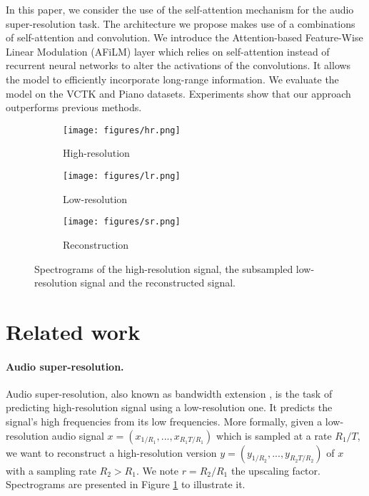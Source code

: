 \documentclass{article}
\begin{document}
In this paper, we consider the use of the self-attention mechanism for the audio super-resolution task. The architecture we propose makes use of a combinations of self-attention and convolution. We introduce the Attention-based Feature-Wise Linear Modulation (AFiLM) layer which relies on self-attention instead of recurrent neural networks to alter the activations of the convolutions. It allows the model to efficiently incorporate long-range information. We evaluate the model on the VCTK \cite{yamagishi2012english} and Piano \cite{mehri2016samplernn} datasets. Experiments show that our approach outperforms previous methods.

\begin{figure}
    \centering
    \begin{subfigure}[b]{0.15\textwidth}
        \centering
        \texttt{[image: figures/hr.png]}
        \caption{High-resolution}
    \end{subfigure}
    \begin{subfigure}[b]{0.15\textwidth}
        \centering
        \texttt{[image: figures/lr.png]}
        \caption{Low-resolution}
    \end{subfigure}
    \begin{subfigure}[b]{0.15\textwidth}
        \centering
        \texttt{[image: figures/sr.png]}
        \caption{Reconstruction}
    \end{subfigure}
    \caption{Spectrograms of the high-resolution signal, the subsampled low-resolution signal and the reconstructed signal.}
    \label{fig:spectrogram}
\end{figure}

\section{Related work}
\label{sec:related_work}
\paragraph*{Audio super-resolution.}
Audio super-resolution, also known as bandwidth extension \cite{ekstrand2002bandwidth,larsen2005audio}, is the task of predicting high-resolution signal using a low-resolution one. It predicts the signal’s high frequencies from its low frequencies. More formally, given a low-resolution audio signal $x=(x_{1/R_1},...,x_{R_1T/R_1})$ which is sampled at a rate $R_1/T$, we want to reconstruct a high-resolution version $y=(y_{1/R_2},...,y_{R_2T/R_2})$ of $x$ with a sampling rate $R_2 > R_1$. We note $r=R_2/R_1$ the upscaling factor. Spectrograms are presented in Figure \ref{fig:spectrogram} to illustrate it.
\end{document}
